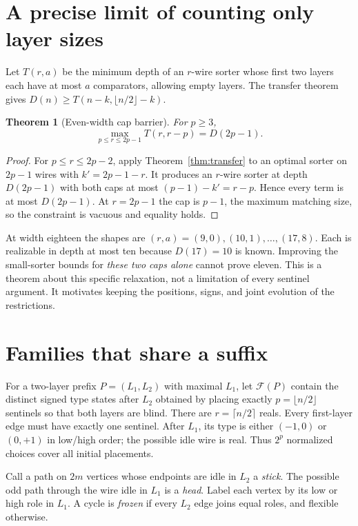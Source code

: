\documentclass[11pt]{article}
\newtheorem{theorem}{Theorem}[section]
\newcommand{\F}{\mathcal F}
\begin{document}
\section{A precise limit of counting only layer sizes}\label{sec:barrier}
Let $T(r,a)$ be the minimum depth of an $r$-wire sorter whose first two layers each have at most $a$ comparators, allowing empty layers. The transfer theorem gives $D(n)\ge T(n-k,\lfloor n/2\rfloor-k)$.

\begin{theorem}[Even-width cap barrier]\label{thm:barrier}
For $p\ge3$,
\[
\max_{p\le r\le2p-1}T(r,r-p)=D(2p-1).
\]
\end{theorem}
\begin{proof}
For $p\le r\le2p-2$, apply Theorem~\ref{thm:transfer} to an optimal sorter on $2p-1$ wires with $k'=2p-1-r$. It produces an $r$-wire sorter at depth $D(2p-1)$ with both caps at most $(p-1)-k'=r-p$. Hence every term is at most $D(2p-1)$. At $r=2p-1$ the cap is $p-1$, the maximum matching size, so the constraint is vacuous and equality holds.
\end{proof}

At width eighteen the shapes are $(r,a)=(9,0),(10,1),\ldots,(17,8)$. Each is realizable in depth at most ten because $D(17)=10$ is known. Improving the small-sorter bounds for \emph{these two caps alone} cannot prove eleven. This is a theorem about this specific relaxation, not a limitation of every sentinel argument. It motivates keeping the positions, signs, and joint evolution of the restrictions.

\section{Families that share a suffix}\label{sec:families}
For a two-layer prefix $P=(L_1,L_2)$ with maximal $L_1$, let $\F(P)$ contain the distinct signed type states after $L_2$ obtained by placing exactly $p=\lfloor n/2\rfloor$ sentinels so that both layers are blind. There are $r=\lceil n/2\rceil$ reals. Every first-layer edge must have exactly one sentinel. After $L_1$, its type is either $(-1,0)$ or $(0,+1)$ in low/high order; the possible idle wire is real. Thus $2^p$ normalized choices cover all initial placements.

Call a path on $2m$ vertices whose endpoints are idle in $L_2$ a \emph{stick}. The possible odd path through the wire idle in $L_1$ is a \emph{head}. Label each vertex by its low or high role in $L_1$. A cycle is \emph{frozen} if every $L_2$ edge joins equal roles, and flexible otherwise.
\end{document}
